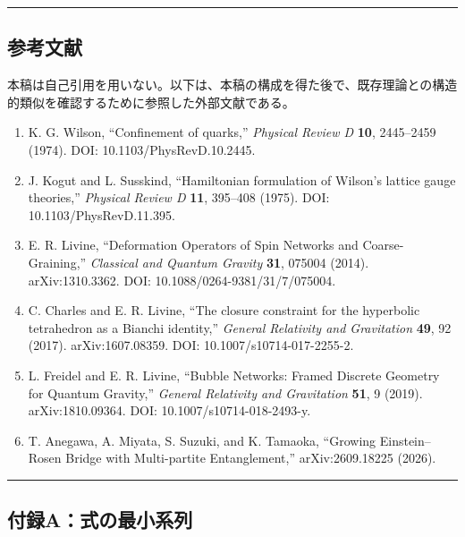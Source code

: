 \documentclass[
  a4paper,
]{ltjsarticle}
\providecommand{\tightlist}{%
  \setlength{\itemsep}{0pt}\setlength{\parskip}{0pt}}
\begin{document}
\begin{center}\rule{0.5\linewidth}{0.5pt}\end{center}

\subsection{参考文献}\label{ux53c2ux8003ux6587ux732e}

本稿は自己引用を用いない。以下は、本稿の構成を得た後で、既存理論との構造的類似を確認するために参照した外部文献である。

\begin{enumerate}
\def\labelenumi{\arabic{enumi}.}
\tightlist
\item
  K. G. Wilson, ``Confinement of quarks,'' \emph{Physical Review D}
  \textbf{10}, 2445--2459 (1974). DOI: 10.1103/PhysRevD.10.2445.
\item
  J. Kogut and L. Susskind, ``Hamiltonian formulation of Wilson's
  lattice gauge theories,'' \emph{Physical Review D} \textbf{11},
  395--408 (1975). DOI: 10.1103/PhysRevD.11.395.
\item
  E. R. Livine, ``Deformation Operators of Spin Networks and
  Coarse-Graining,'' \emph{Classical and Quantum Gravity} \textbf{31},
  075004 (2014). arXiv:1310.3362. DOI: 10.1088/0264-9381/31/7/075004.
\item
  C. Charles and E. R. Livine, ``The closure constraint for the
  hyperbolic tetrahedron as a Bianchi identity,'' \emph{General
  Relativity and Gravitation} \textbf{49}, 92 (2017). arXiv:1607.08359.
  DOI: 10.1007/s10714-017-2255-2.
\item
  L. Freidel and E. R. Livine, ``Bubble Networks: Framed Discrete
  Geometry for Quantum Gravity,'' \emph{General Relativity and
  Gravitation} \textbf{51}, 9 (2019). arXiv:1810.09364. DOI:
  10.1007/s10714-018-2493-y.
\item
  T. Anegawa, A. Miyata, S. Suzuki, and K. Tamaoka, ``Growing
  Einstein--Rosen Bridge with Multi-partite Entanglement,''
  arXiv:2609.18225 (2026).
\end{enumerate}

\begin{center}\rule{0.5\linewidth}{0.5pt}\end{center}

\subsection{付録A：式の最小系列}\label{ux4ed8ux9332aux5f0fux306eux6700ux5c0fux7cfbux5217}
\end{document}
